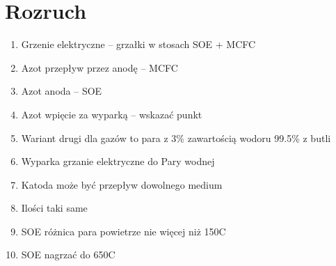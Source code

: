 \section{Rozruch}

\begin{enumerate}
\item Grzenie elektryczne – grzałki w stosach SOE + MCFC
\item Azot przepływ przez anodę – MCFC
\item Azot anoda – SOE
\item Azot wpięcie za wyparką – wskazać punkt
\item Wariant drugi dla gazów to para z 3\% zawartością wodoru 99.5\% z
butli 
\item Wyparka grzanie elektryczne do Pary wodnej
\item Katoda może być przepływ dowolnego medium
\item Ilości taki same 
\item SOE różnica para powietrze nie więcej niż 150\textdegree C 
\item SOE nagrzać do 650\textdegree C

\end{enumerate}